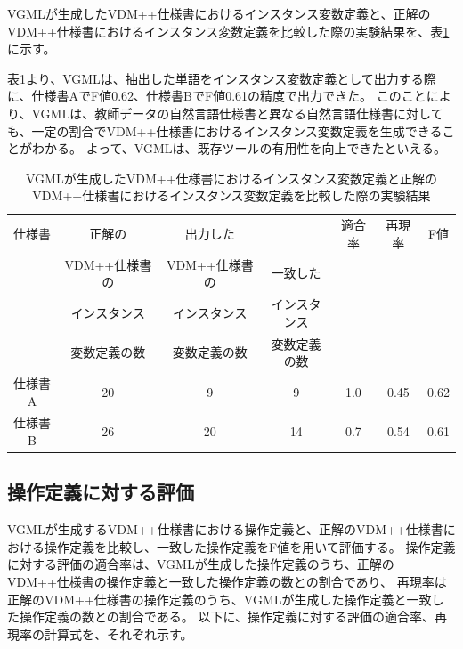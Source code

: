 VGMLが生成したVDM++仕様書におけるインスタンス変数定義と、正解のVDM++仕様書におけるインスタンス変数定義を比較した際の実験結果を、表\ref{table:instanceResult}に示す。

表\ref{table:instanceResult}より、VGMLは、抽出した単語をインスタンス変数定義として出力する際に、仕様書AでF値0.62、仕様書BでF値0.61の精度で出力できた。
このことにより、VGMLは、教師データの自然言語仕様書と異なる自然言語仕様書に対しても、一定の割合でVDM++仕様書におけるインスタンス変数定義を生成できることがわかる。
よって、VGMLは、既存ツールの有用性を向上できたといえる。

\begin{table}[t]
	\caption{VGMLが生成したVDM++仕様書におけるインスタンス変数定義と正解のVDM++仕様書におけるインスタンス変数定義を比較した際の実験結果}
	\label{table:instanceResult}
	\begin{center}
        \begin{tabular}{c|c|c|c|c|c|c}
            \hline
            仕様書  & 正解の & 出力した &  & 適合率 & 再現率 & F値  \\
                    & VDM++仕様書の & VDM++仕様書の & 一致した  &        &       &      \\
                    & インスタンス & インスタンス & インスタンス  &        &       &      \\
                    & 変数定義の数 & 変数定義の数 & 変数定義の数  &        &       &      \\
            \hline
            仕様書A & 20                             & 9                 & 9                  & 1.0   & 0.45    & 0.62  \\
            \hline
            仕様書B & 26                             & 20                  & 14                  & 0.7   & 0.54   & 0.61 \\
            \hline
        \end{tabular}
    \end{center}
\end{table}

\subsection{操作定義に対する評価}
VGMLが生成するVDM++仕様書における操作定義と、正解のVDM++仕様書における操作定義を比較し、一致した操作定義をF値を用いて評価する。
操作定義に対する評価の適合率は、VGMLが生成した操作定義のうち、正解のVDM++仕様書の操作定義と一致した操作定義の数との割合であり、
再現率は正解のVDM++仕様書の操作定義のうち、VGMLが生成した操作定義と一致した操作定義の数との割合である。
以下に、操作定義に対する評価の適合率、再現率の計算式を、それぞれ示す。

